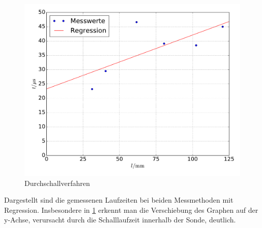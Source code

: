 \documentclass[
  bibliography=totoc,     %
  captions=tableheading,  %
  titlepage=firstiscover, %
]{scrartcl}
\begin{document}
  \begin{figure}
    \centering
    \includegraphics[width=\textwidth]{Dur.pdf}
    \caption{Durchschallverfahren}
    \label{abb:2}
  \end{figure}
\noindent
Dargestellt sind die gemessenen Laufzeiten bei beiden Messmethoden mit Regression.
Insbesondere in \ref{abb:2} erkennt man die Verschiebung des Graphen auf der y-Achse,
verursacht durch die Schalllaufzeit innerhalb der Sonde, deutlich.
\end{document}
